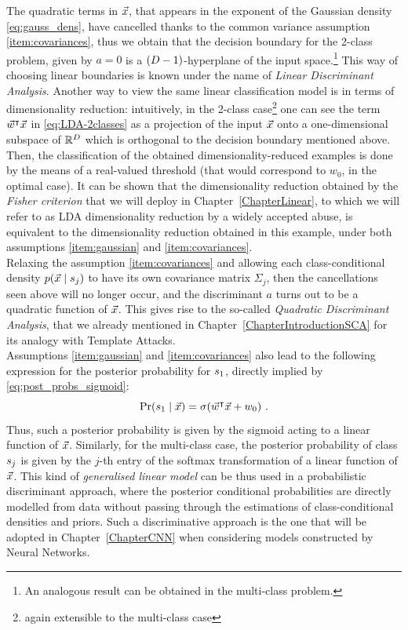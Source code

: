 The quadratic terms in $\vec{x}$, that appears in the exponent of the Gaussian density \eqref{eq:gauss_dens}, have cancelled thanks to the common variance assumption \ref{item:covariances}, thus we obtain that the decision boundary for the 2-class problem, given by $a=0$ is a $(D - 1)$-hyperplane of the input space.\footnote{An analogous result can be obtained in the multi-class problem.} This way of choosing linear boundaries is known under the name of \emph{Linear Discriminant Analysis}. Another way to view the same linear classification model is in terms of dimensionality reduction: intuitively, in the 2-class case\footnote{again extensible to the multi-class case} one can see the term $\vec{w}^\intercal \vec{x}$ in \eqref{eq:LDA-2classes} as a projection of the input $\vec{x}$ onto a one-dimensional subspace of $\mathbb{R}^D$ which is orthogonal to the decision boundary mentioned above. Then, the classification of the obtained dimensionality-reduced examples is done by the means of a real-valued threshold (that would correspond to $w_0$, in the optimal case). It can be shown that the dimensionality reduction obtained by the \emph{Fisher criterion} that we will deploy in Chapter~\ref{ChapterLinear}, to which we will refer to as LDA dimensionality reduction by a widely accepted abuse, is equivalent to the dimensionality reduction obtained in this example, under both assumptions \ref{item:gaussian} and \ref{item:covariances}.  \\
Relaxing the assumption \ref{item:covariances} and allowing each class-conditional density $p(\vec{x}\mid s_{j})$ to have its own covariance matrix $\Sigma_j$, then the cancellations seen above will no longer occur, and the discriminant $a$ turns out to be a quadratic function of $\vec{x}$. This gives rise to the so-called \emph{Quadratic Discriminant Analysis}, that we already mentioned in Chapter~\ref{ChapterIntroductionSCA} for its analogy with Template Attacks.\\

Assumptions \ref{item:gaussian} and \ref{item:covariances} also lead to the following expression for the posterior probability for $s_{1}$, directly implied by \eqref{eq:post_probs_sigmoid}: 
\begin{equation}\label{eq:binary_linear_classifier}
\prob(\given{\sensVarValue{1}}{\vLeakVec}) = \sigma(\www^\intercal \vLeakVec + w_0)\mbox{ .}
\end{equation}
Thus, such a posterior probability is given by the sigmoid acting to a linear function of $\vec{x}$. Similarly, for the multi-class case, the posterior probability of class $s_{j}$ is given by the $j$-th entry of the softmax transformation of a linear function of $\vec{x}$. This kind of \emph{generalised linear model} can be thus used in a probabilistic discriminant approach, where the posterior conditional probabilities are directly modelled from data without passing through the estimations of class-conditional densities and priors. Such a discriminative approach is the one that will be adopted in Chapter~\ref{ChapterCNN} when considering models constructed by Neural Networks.

